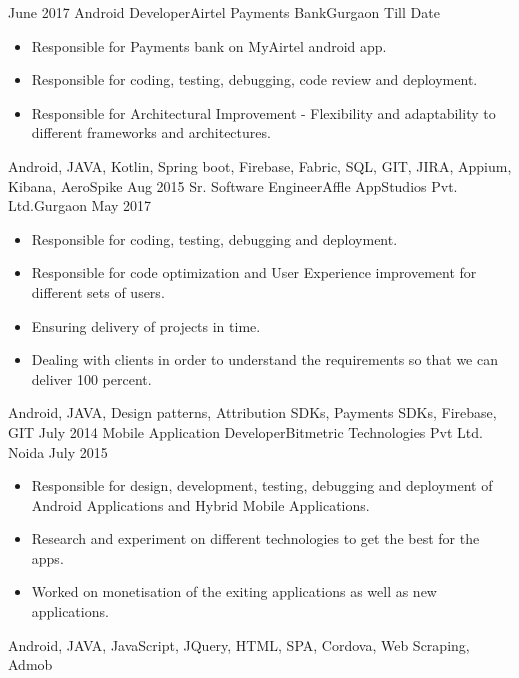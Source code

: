 %
%
%
\begin{experiences}
  \experience
    {June 2017}   {Android Developer}{Airtel Payments Bank}{Gurgaon}
    {Till Date} {
                      \begin{itemize}
                        \item Responsible for Payments bank on MyAirtel android app.                         
                        \item Responsible for coding, testing, debugging, code review and deployment.
                         \item Responsible for Architectural Improvement - Flexibility and adaptability to different frameworks and architectures. 
                      \end{itemize}
                    }
                    {Android, JAVA, Kotlin, Spring boot, Firebase, Fabric, SQL, GIT, JIRA, Appium, Kibana, AeroSpike }
  \emptySeparator
  \experience
    {Aug 2015}   {Sr. Software Engineer}{Affle AppStudios Pvt. Ltd.}{Gurgaon}
    {May 2017} {
                      \begin{itemize}
                        \item Responsible for coding, testing, debugging and deployment.
                        \item Responsible for code optimization and User Experience improvement for different sets of users.
                        \item Ensuring delivery of projects in time.
                        \item Dealing with clients in order to understand the requirements so that we can deliver 100 percent. 
                      \end{itemize}
                    }
                    {Android, JAVA, Design patterns, Attribution SDKs, Payments SDKs, Firebase, GIT }
  \emptySeparator
  \experience
    {July 2014}   {Mobile Application Developer}{Bitmetric Technologies Pvt Ltd. }{Noida}
    {July 2015} {
                      \begin{itemize}
                        \item Responsible for design, development, testing, debugging and deployment of Android Applications and Hybrid Mobile Applications. 
                        \item Research and experiment on different technologies to get the best for the apps. 
                        \item Worked on monetisation of the exiting applications as well as new applications.
                      \end{itemize}
                    }
                    {Android, JAVA, JavaScript, JQuery, HTML, SPA, Cordova, Web Scraping, Admob }
  \emptySeparator
\end{experiences}
